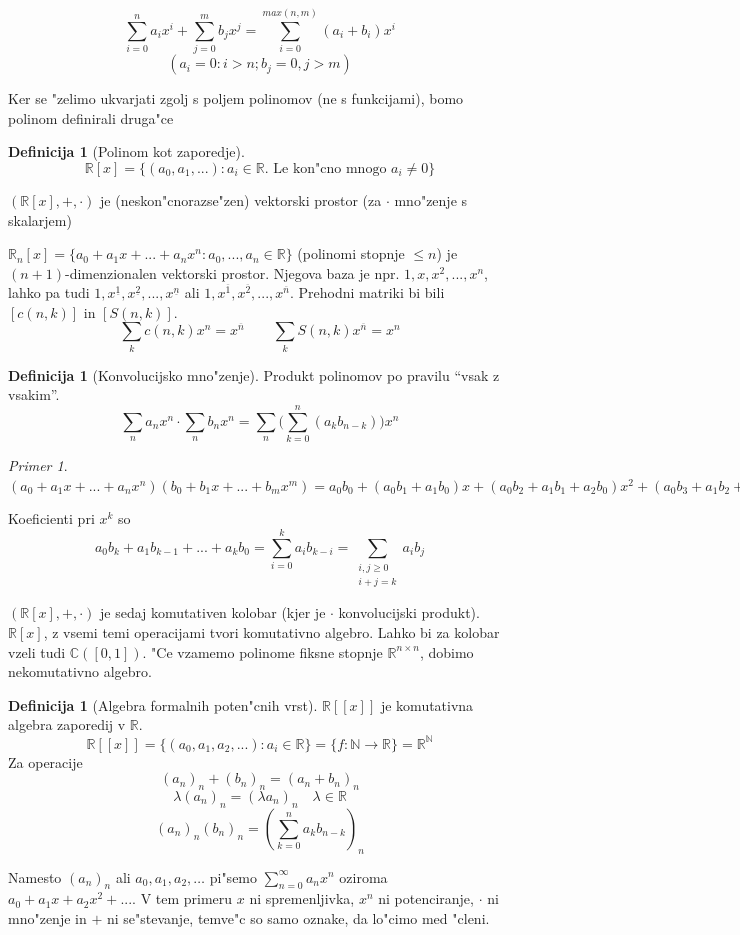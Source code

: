 \documentclass[a4paper,12pt]{article}
\theoremstyle{definition}
\newtheorem{defn}[counter]{Definicija}
\theoremstyle{remark}
\newtheorem*{ex}{Primer}
\newcommand{\N}{\mathbb{N}}
\newcommand{\R}{\mathbb{R}}
\newcommand{\C}{\mathbb{C}}
\begin{document}
\[\sum_{i = 0}^n a_i x^{i} + \sum_{j = 0}^m b_j x^j = \sum_{i = 0}^{max(n, m)}(a_i + b_i)x^{i}\]
\[(a_i = 0: i > n; b_j = 0, j > m)\]

Ker se "zelimo ukvarjati zgolj s poljem polinomov (ne s funkcijami), bomo polinom definirali druga"ce
\begin{defn}[Polinom kot zaporedje]
	\[\R[x] = \{(a_0, a_1, ...): a_i \in \R. \text{ Le kon"cno mnogo }a_i \neq 0\}\]
\end{defn}

$(\R[x], +, \cdot)$ je (neskon"cnorazse"zen) vektorski prostor (za $\cdot$ mno"zenje s skalarjem)

$\R_n[x] = \{a_0 + a_1 x + ... + a_n x^n: a_0, ..., a_n \in \R\}$ (polinomi stopnje $\leqslant n$) je $(n + 1)$-dimenzionalen vektorski prostor. Njegova baza je npr. $1, x, x^2, ..., x^n$, lahko pa tudi $1, x^{\underline{1}}, x^{\underline{2}}, ..., x^{\underline{n}}$ ali $1, x^{\overline{1}}, x^{\overline{2}}, ..., x^{\overline{n}}$. Prehodni matriki bi bili $[c(n, k)]$ in $[S(n, k)]$.
\[
	\sum_k c(n, k) x^n = x^{\overline{n}}
	\qquad
	\sum_k S(n, k) x^{\overline{n}} = x^n
\]

\begin{defn}[Konvolucijsko mno"zenje]
	Produkt polinomov po pravilu ``vsak z vsakim''.
	\[\sum_na_nx^n \cdot \sum_nb_nx^n = \sum_n\big(\sum_{k=0}^n(a_kb_{n-k})\big)x^n\]
\end{defn}
\begin{ex}
	$(a_0 + a_1 x + ... + a_n x^n)(b_0 + b_1 x + ... + b_m x^m) = a_0 b_0 + (a_0 b_1 + a_1 b_0)x + (a_0 b_2 + a_1 b_ 1 + a_2 b_0) x^2 + (a_0 b_3 + a_1 b_2 + a_2 b_1 + a_3 b_0)x^3 + ... + a_n b_m x^{n + m}$
\end{ex}
Koeficienti pri $x^k$ so
\[a_0 b_k + a_1 b_{k - 1} + ... + a_k b_0 = \sum_{i = 0}^k a_i b_{k - i} = \sum_{\substack{i, j \geqslant 0 \\ i + j = k}} a_i b_j\]

$(\R[x], +, \cdot)$ je sedaj komutativen kolobar (kjer je $\cdot$ konvolucijski produkt). $\R[x]$, z vsemi temi operacijami tvori komutativno algebro. Lahko bi za kolobar vzeli tudi $\C([0, 1])$. "Ce vzamemo polinome fiksne stopnje $\R^{n \times n}$, dobimo nekomutativno algebro.

\label{TODO: definiraj kaj je algebra}
\begin{defn}[Algebra formalnih poten"cnih vrst]
    $\R[[x]]$ je komutativna algebra zaporedij v $\R$.
    \[\R[[x]] = \{(a_0, a_1, a_2, ...): a_i \in \R\} = \{f: \N \rightarrow \R\} = \R^{\N}\]
	Za operacije
    \[(a_n)_n + (b_n)_n = (a_n + b_n)_n\]
    \[\lambda(a_n)_n = (\lambda a_n)_n \quad \lambda \in \R \]
    \[(a_n)_n (b_n)_n = (\sum_{k = 0}^n a_k b_{n - k})_n\]
\end{defn}
Namesto $(a_n)_n$ ali $a_0, a_1, a_2, \ldots$ pi"semo $\sum_{n = 0}^{\infty} a_n x^n$ oziroma $a_0 + a_1 x + a_2 x^2 + ...$. V tem primeru $x$ ni spremenljivka, $x^n$ ni potenciranje, $\cdot$ ni mno"zenje in $+$ ni se"stevanje, temve"c so samo oznake, da lo"cimo med "cleni.
\end{document}
